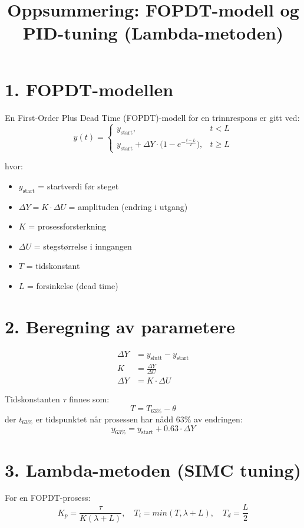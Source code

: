 \documentclass[a4paper,12pt]{article}
\title{Oppsummering: FOPDT-modell og PID-tuning (Lambda-metoden)}
\author{}
\date{}
\begin{document}
\maketitle

\section*{1. FOPDT-modellen}
En First-Order Plus Dead Time (FOPDT)-modell for en trinnrespons er gitt ved:
\[
y(t) =
\begin{cases}
y_{\text{start}}, & t < L \\
y_{\text{start}} + \Delta Y\cdot \big(1 - e^{-\frac{t-L}{T}}\big), & t \ge L
\end{cases}
\]

\noindent hvor:
\begin{itemize}
    \item $y_{\text{start}}$ = startverdi før steget
    \item $\Delta Y = K \cdot \Delta U$ = amplituden (endring i utgang)
    \item $K$ = prosessforsterkning
    \item $\Delta U$ = stegstørrelse i inngangen
    \item $T$ = tidskonstant
    \item $L$ = forsinkelse (dead time)
\end{itemize}

\section*{2. Beregning av parametere}
\begin{align*}
\Delta Y &= y_{\text{slutt}} - y_{\text{start}} \\
K &= \frac{\Delta Y}{\Delta U} \\
\Delta Y &= K \cdot \Delta U
\end{align*}

\noindent Tidskonstanten $\tau$ finnes som:
\[
T = T_{63\%} - \theta
\]
der $t_{63\%}$ er tidspunktet når prosessen har nådd $63\%$ av endringen:
\[
y_{63\%} = y_{\text{start}} + 0.63 \cdot \Delta Y
\]

\section*{3. Lambda-metoden (SIMC tuning)}
For en FOPDT-prosess:
\[
K_p = \frac{\tau}{K(\lambda + L)}, \quad T_i =min(T,\lambda+L), \quad T_d = \frac{L}{2}
\]
\end{document}
